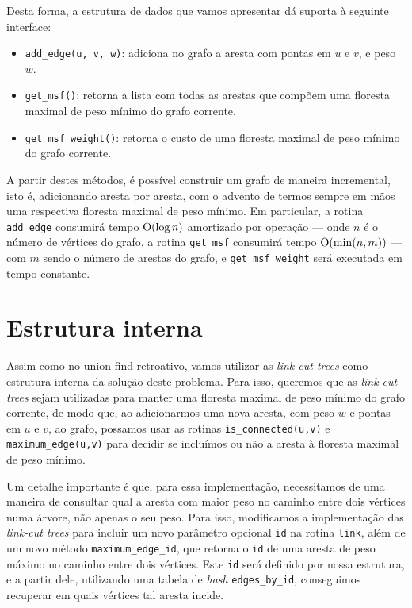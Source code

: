 Desta forma, a estrutura de dados que vamos apresentar dá suporta à seguinte interface:

\begin{itemize}
    \item \texttt{add\_edge(u, v, w)}: adiciona no grafo a aresta com pontas em $u$ e $v$, e peso $w$.
    \item \texttt{get\_msf()}: retorna a lista com todas as arestas que compõem uma floresta maximal de peso mínimo do grafo corrente.
    \item \texttt{get\_msf\_weight()}: retorna o custo de uma floresta maximal de peso mínimo do grafo corrente.
\end{itemize}

A partir destes métodos, é possível construir um grafo de maneira incremental, isto é, adicionando aresta por aresta, com o advento de termos sempre em mãos uma respectiva floresta maximal de peso mínimo. Em particular, a rotina \texttt{add\_edge} consumirá tempo $\mathrm{O} (\log n)$ amortizado por operação --- onde $n$ é o número de vértices do grafo, a rotina \texttt{get\_msf} consumirá tempo $\mathrm{O}(\min(n, m))$ --- com $m$ sendo o número de arestas do grafo, e \texttt{get\_msf\_weight} será executada em tempo constante.

\section{Estrutura interna}
\label{sec:imsf-est-int}

Assim como no union-find retroativo, vamos utilizar as \emph{link-cut trees} como estrutura interna da solução deste problema. Para isso, queremos que as \emph{link-cut trees} sejam utilizadas para manter uma floresta maximal de peso mínimo do grafo corrente, de modo que, ao adicionarmos uma nova aresta, com peso $w$ e pontas em $u$ e $v$, ao grafo, possamos usar as rotinas \texttt{is\_connected(u,v)} e \texttt{maximum\_edge(u,v)} para decidir se incluímos ou não a aresta à floresta maximal de peso mínimo.

Um detalhe importante é que, para essa implementação, necessitamos de uma maneira de consultar qual a aresta com maior peso no caminho entre dois vértices numa árvore, não apenas o seu peso. Para isso, modificamos a implementação das \emph{link-cut trees} para incluir um novo parâmetro opcional \texttt{id} na rotina \texttt{link}, além de um novo  método \texttt{maximum\_edge\_id}, que retorna o \texttt{id} de uma aresta de peso máximo no caminho entre dois vértices. Este \texttt{id} será definido por nossa estrutura, e a partir dele, utilizando uma tabela de \emph{hash} \texttt{edges\_by\_id}, conseguimos recuperar em quais vértices tal aresta incide.

